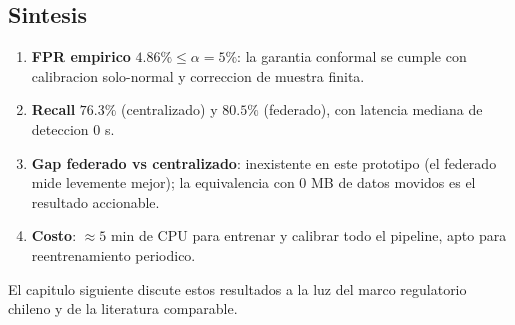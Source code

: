 \subsection{Sintesis}

\begin{enumerate}[leftmargin=*,itemsep=2pt]
  \item \textbf{FPR empirico} $4.86\% \le \alpha = 5\%$: la
        garantia conformal se cumple con calibracion solo-normal y
        correccion de muestra finita.
  \item \textbf{Recall} $76.3\%$ (centralizado) y $80.5\%$
        (federado), con latencia mediana de deteccion $0$ s.
  \item \textbf{Gap federado vs centralizado}: inexistente en este
        prototipo (el federado mide levemente mejor); la
        equivalencia con 0 MB de datos movidos es el resultado
        accionable.
  \item \textbf{Costo}: $\approx 5$ min de CPU para entrenar y
        calibrar todo el pipeline, apto para reentrenamiento
        periodico.
\end{enumerate}

El capitulo siguiente discute estos resultados a la luz del marco
regulatorio chileno y de la literatura comparable.

